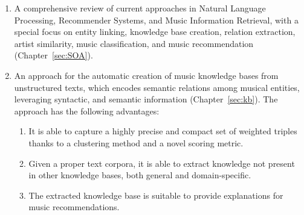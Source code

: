 \begin{enumerate}

\item 
A comprehensive review of current approaches in Natural Language Processing, Recommender Systems, and Music Information Retrieval, with a special focus on entity linking, knowledge base creation, relation extraction, artist similarity, music classification, and music recommendation (Chapter~\ref{sec:SOA}).


\item 
An approach for the automatic creation of music knowledge bases from unstructured texts, which encodes semantic relations among musical entities, leveraging syntactic, and semantic information (Chapter~\ref{sec:kb}). %
The approach has the following advantages:

\begin{enumerate}
\item 
It is able to capture a highly precise and compact set of weighted triples thanks to a clustering method and a novel scoring metric. 
\item 
Given a proper text corpora, it is able to extract knowledge not present in other knowledge bases, both general and domain-specific. 
\item
The extracted knowledge base is suitable to provide explanations for music recommendations.
\end{enumerate}


\end{enumerate}
